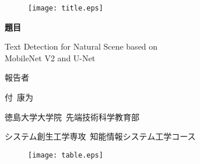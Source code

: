 \documentclass[22pt, UTF8]{article}
\numberwithin{figure}{section}
\numberwithin{table}{section}
\numberwithin{equation}{section} %
\begin{document}
    
\thispagestyle{empty} %
\begin{center}
    \begin{figure}[H]
        \begin{center}
            \texttt{[image: title.eps]}
        \end{center}
    \end{figure}
    \vspace{2mm}
    {\LARGE\bf 題目 \par} 
    {\LARGE \textup Text Detection for Natural Scene based on \\MobileNet V2 and U-Net\par}
    \vspace{10mm}
    {\Large 報告者 \par}
    {\LARGE \quad 付\ 康为　\par}
    \vspace{10mm}
    {\Large 徳島大学大学院\ 先端技術科学教育部 \par}
    {\Large システム創生工学専攻\ 知能情報システム工学コース \par}
    \vspace{15mm}
    \begin{figure}[H]
        \begin{center}
            \texttt{[image: table.eps]}
        \end{center}
    \end{figure}
\end{center}

\makeatother

\newpage %
\rhead{\thepage}
\cfoot{}
\tableofcontents %
\newpage
\listoftables %
\newpage
\listoffigures %
\clearpage
{}
\end{document}
